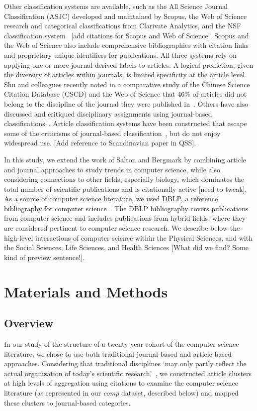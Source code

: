 Other classification systems are available, such as the All Science Journal Classification (ASJC) developed and maintained by Scopus, the Web of Science research and categorical classifications from Clarivate Analytics, and the NSF classification system~\cite{nsf_classification} [add citations for Scopus and Web of Science]. Scopus and the Web of Science also include comprehensive bibliographies with citation links and proprietary unique identifiers for publications. 
All three systems rely on applying one or more journal-derived labels to articles.  
A logical prediction, given the diversity of articles within journals, is limited specificity at the article level. 
Shu and colleagues recently noted in a comparative study of the Chinese Science Citation Database (CSCD) \cite{CSCD} and the Web of Science that 46\% of articles did not belong to the discipline of the journal they were published in~\cite{shu_comparing_2019}. 
Others have also discussed and critiqued disciplinary assignments using journal-based classifications~\cite{wang_large-scale_2016,perianes-rodriguez_comparison_2017}. 
Article classification systems have been constructed that escape some of the criticisms of journal-based classification~\cite{traag_louvain_2019,boyack_classification_2014,waltman_new_2012}, but do not enjoy widespread use. [Add reference to Scandinavian paper in QSS].
 
In this study, we extend the work of Salton and Bergmark by combining article and journal approaches to study trends in computer science, while also considering connections to other fields, especially biology, which dominates the total number of scientific publications and is citationally active [need to tweak]. As a source of computer science literature, we used DBLP, a reference bibliography for computer science~\cite{dblp_ref}. The DBLP bibliography covers publications from computer science and includes publications from hybrid fields, where they are considered pertinent to computer science research. We describe below the high-level interactions of computer science within the Physical Sciences, and with the Social Sciences, Life Sciences, and Health Sciences [What did we find? Some kind of preview sentence!].

\section{Materials and Methods}
\label{sec:methods}


 \subsection{Overview}
 In our study of the structure of a twenty year cohort of the computer science literature, we chose to use both traditional journal-based and article-based approaches. Considering that traditional disciplines `may only partly reflect the actual organization of today's scientific research'~\cite{waltman_new_2012}, we constructed article clusters at high levels of aggregation using citations to examine the  computer science literature (as represented in our \emph{comp} dataset, described below) and mapped these clusters to journal-based categories.
 
